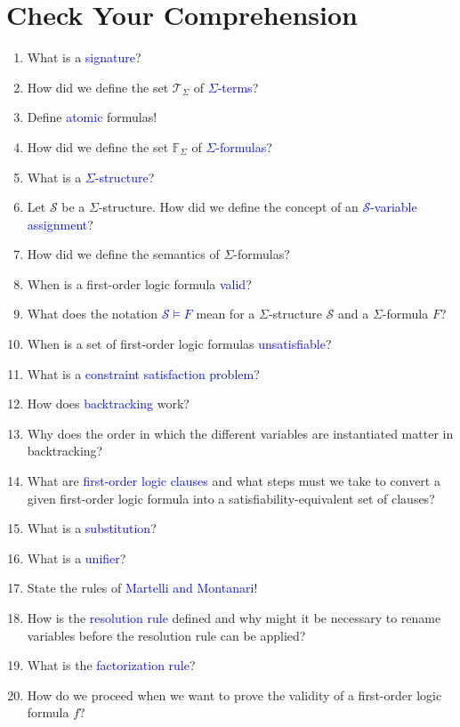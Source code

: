 \pagebreak

\section{Check Your Comprehension}
\begin{enumerate}
\item What is a \textcolor{blue}{signature}?
\item How did we define the set $\mathcal{T}_\Sigma$ of \textcolor{blue}{$\Sigma$-terms}?
\item Define \textcolor{blue}{atomic} formulas!
\item How did we define the set $\mathbb{F}_\Sigma$ of \textcolor{blue}{$\Sigma$-formulas}?
\item What is a \textcolor{blue}{$\Sigma$-structure}?
\item Let $\mathcal{S}$ be a $\Sigma$-structure. How did we define the concept of
      an \textcolor{blue}{$\mathcal{S}$-variable assignment}?
\item How did we define the semantics of $\Sigma$-formulas?
\item When is a first-order logic formula \textcolor{blue}{valid}?
\item What does the notation \textcolor{blue}{$\mathcal{S} \models F$} mean for a $\Sigma$-structure $\mathcal{S}$ and a
      $\Sigma$-formula $F$?
\item When is a set of first-order logic formulas \textcolor{blue}{unsatisfiable}?
\item What is a \textcolor{blue}{constraint satisfaction problem}?
\item How does \textcolor{blue}{backtracking} work?
\item Why does the order in which the different variables are instantiated matter in backtracking?
\item What are \textcolor{blue}{first-order logic clauses} and what steps must we take to convert a given
      first-order logic formula into a satisfiability-equivalent set of clauses?
\item What is a \textcolor{blue}{substitution}?
\item What is a \textcolor{blue}{unifier}?
\item State the rules of \textcolor{blue}{Martelli and Montanari}!
\item How is the \textcolor{blue}{resolution rule} defined and why might it be necessary to rename variables
      before the resolution rule can be applied?
\item What is the \textcolor{blue}{factorization rule}?
\item How do we proceed when we want to prove the validity of a first-order logic formula $f$?
\end{enumerate}


